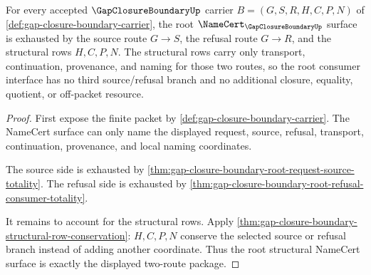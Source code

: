 \begin{theorem}
\label{thm:gap-closure-boundary-root-structural-namecert-exhaustion}
For every accepted $\GapClosureBoundaryUp$ carrier $B=(G,S,R,H,C,P,N)$ of \autoref{def:gap-closure-boundary-carrier}, the root $\NameCert_{\GapClosureBoundaryUp}$ surface is exhausted by the source route $G \longrightarrow S$, the refusal route $G \longrightarrow R$, and the structural rows $H,C,P,N$. The structural rows carry only transport, continuation, provenance, and naming for those two routes, so the root consumer interface has no third source/refusal branch and no additional closure, equality, quotient, or off-packet resource.
\end{theorem}
\begin{proof}
First expose the finite packet by \autoref{def:gap-closure-boundary-carrier}. The NameCert surface can only name the displayed request, source, refusal, transport, continuation, provenance, and local naming coordinates.

The source side is exhausted by \autoref{thm:gap-closure-boundary-root-request-source-totality}. The refusal side is exhausted by \autoref{thm:gap-closure-boundary-root-refusal-consumer-totality}.

It remains to account for the structural rows. Apply \autoref{thm:gap-closure-boundary-structural-row-conservation}: $H,C,P,N$ conserve the selected source or refusal branch instead of adding another coordinate. Thus the root structural NameCert surface is exactly the displayed two-route package.
\end{proof}
